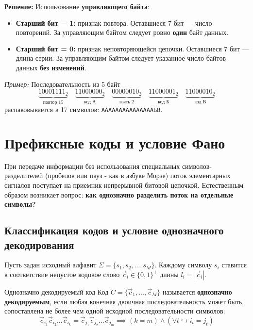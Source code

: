 \documentclass[11pt,a4paper]{article}
\begin{document}
\textbf{Решение:} Использование \textbf{управляющего байта}:
\begin{itemize}
    \item \textbf{Старший бит = 1:} признак повтора. Оставшиеся 7 бит --- число повторений. За управляющим байтом следует ровно \textbf{один} байт данных.
    \item \textbf{Старший бит = 0:} признак неповторяющейся цепочки. Оставшиеся 7 бит --- длина серии. За управляющим байтом следует указанное число байтов данных \textbf{без изменений}.
\end{itemize}

\textit{Пример:} Последовательность из 5 байт
$$\underbrace{10001111_2}_{\text{повтор } 15} \quad \underbrace{11000000_2}_{\text{код А}} \quad \underbrace{00000010_2}_{\text{взять } 2} \quad \underbrace{11000001_2}_{\text{код Б}} \quad \underbrace{11000010_2}_{\text{код В}}$$
распаковывается в 17 символов: \texttt{АААААААААААААААБВ}.

\section{Префиксные коды и условие Фано}

При передаче информации без использования специальных символов-разделителей (пробелов или пауз - как в азбуке Морзе) поток элементарных сигналов поступает на приемник непрерывной битовой цепочкой. Естественным образом возникает вопрос: \textbf{как однозначно разделить поток на отдельные символы?}

\subsection{Классификация кодов и условие однозначного декодирования}

Пусть задан исходный алфавит $\Sigma = \{s_1, s_2, \dots, s_M\}$. Каждому символу $s_i$ ставится в соответствие непустое кодовое слово $\vec{c}_i \in \{0, 1\}^+$ длины $l_i = |\vec{c}_i|$.

\begin{definitionbox}{Однозначно декодируемый код}
Код $C = \{\vec{c}_1, \dots, \vec{c}_M\}$ называется \textbf{однозначно декодируемым}, если любая конечная двоичная последовательность может быть сопоставлена не более чем одной исходной последовательности символов:
$$\vec{c}_{i_1}\vec{c}_{i_2}\dots\vec{c}_{i_k} = \vec{c}_{j_1}\vec{c}_{j_2}\dots\vec{c}_{j_m} \implies (k = m) \land (\forall t \hookrightarrow i_t = j_t)$$
\end{definitionbox}
\end{document}
